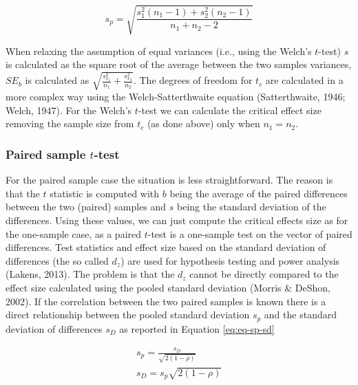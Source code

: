 \documentclass[
  man,floatsintext]{apa7}
\begin{document}
\begin{equation}
    \label{eq:eq-s-p-twsmp}
    s_p = \sqrt{\frac{s_1^2 (n_1 - 1) + s_2^2 (n_2 - 1)}{n_1 + n_2 - 2}}
\end{equation}

When relaxing the assumption of equal variances (i.e., using the Welch's \(t\)-test) \(s\) is calculated as the square root of the average between the two samples variances, \(SE_b\) is calculated as \(\sqrt{\frac{s^2_{x_1}}{n_1} + \frac{s^2_{x_2}}{n_2}}\). The degrees of freedom for \(t_c\) are calculated in a more complex way using the Welch-Satterthwaite equation (Satterthwaite, 1946; Welch, 1947). For the Welch's \(t\)-test we can calculate the critical effect size removing the sample size from \(t_c\) (as done above) only when \(n_1 = n_2\).

\subsubsection{\texorpdfstring{Paired sample \(t\)-test}{Paired sample t-test}}\label{paired-sample-t-test}

For the paired sample case the situation is less straightforward. The reason is that the \(t\) statistic is computed with \(b\) being the average of the paired differences between the two (paired) samples and \(s\) being the standard deviation of the differences. Using these values, we can just compute the critical effects size as for the one-sample case, as a paired \(t\)-test is a one-sample test on the vector of paired differences. Test statistics and effect size based on the standard deviation of differences (the so called \(d_z\)) are used for hypothesis testing and power analysis (Lakens, 2013). The problem is that the \(d_z\) cannot be directly compared to the effect size calculated using the pooled standard deviation (Morris \& DeShon, 2002). If the correlation between the two paired samples is known there is a direct relationship between the pooled standard deviation \(s_p\) and the standard deviation of differences \(s_D\) as reported in Equation \eqref{eq:eq-sp-sd}

\begin{equation}
    \label{eq:eq-sp-sd}
    \begin{gathered}
        s_p =  \frac{s_D}{\sqrt{2(1 - \rho)}} \\
        s_D =  s_p \sqrt{2(1 - \rho)}
    \end{gathered}
\end{equation}
\end{document}
